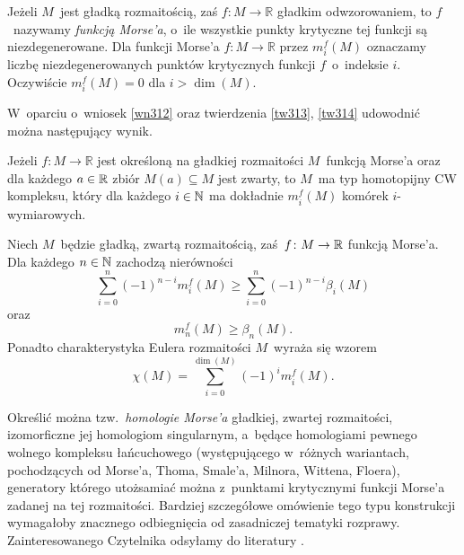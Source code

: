 Jeżeli $M$~jest gładką rozmaitością, zaś $f\colon M\to \mathbb{R}$ gładkim odwzorowaniem, to $f$~nazywamy \textit{funkcją Morse'a}, o~ile wszystkie punkty krytyczne tej funkcji są niezdegenerowane. Dla funkcji Morse'a $f\colon M\to \mathbb{R}$ przez $m^f_i(M)$ oznaczamy liczbę niezdegenerowanych punktów krytycznych funkcji $f$~o~indeksie $i$. Oczywiście $m^f_i(M)=0$ dla $i>\dim(M)$.

W~oparciu o~wniosek \ref{wn312} oraz twierdzenia \ref{tw313}, \ref{tw314} udowodnić można następujący wynik.

\begin{tw}\label{tw-main_thm_morse_theory}
Jeżeli $f\colon M\to \mathbb{R}$ jest określoną na gładkiej rozmaitości $M$~funkcją Morse'a oraz dla każdego $a\in\mathbb{R}$ zbiór $M(a)\subseteq M$ jest zwarty, to $M$~ma typ homotopijny CW kompleksu, który dla każdego $i\in\mathbb{N}$ ma dokładnie $m_i^f(M)$  komórek \mbox{$i$-wymiarowych}.
\end{tw}

\begin{wn}\label{wn-nier_morsea}
Niech $M$~będzie gładką, zwartą rozmaitością, zaś~$f\colon M\to \mathbb{R}$ funkcją Morse'a. Dla każdego $n\in\mathbb{N}$ zachodzą nierówności
\[\sum_{i=0}^{n}(-1)^{n-i}m_i^f(M)\geq \sum_{i=0}^{n}(-1)^{n-i}\beta_i(M)\]
oraz
\[m_n^f(M)\geq \beta_n(M).\] Ponadto charakterystyka Eulera rozmaitości $M$~wyraża się wzorem \[\chi(M)=\sum_{i=0}^{\dim(M)}(-1)^i m_i^f(M).\]
\end{wn} 

Określić można tzw.~\textit{homologie Morse'a} gładkiej, zwartej rozmaitości, izomorficzne jej homologiom singularnym, a~będące homologiami pewnego wolnego kompleksu łańcuchowego (występującego w~różnych wariantach, pochodzących od  Morse'a, Thoma, Smale'a, Milnora, Wittena, Floera), generatory którego utożsamiać można z~punktami krytycznymi funkcji Morse'a zadanej na tej rozmaitości. Bardziej szczegółowe omówienie  tego typu konstrukcji wymagałoby znacznego odbiegnięcia od zasadniczej tematyki rozprawy. Zainteresowanego Czytelnika odsyłamy do literatury \cite{Banyaga04,Nicolaescu11}.




